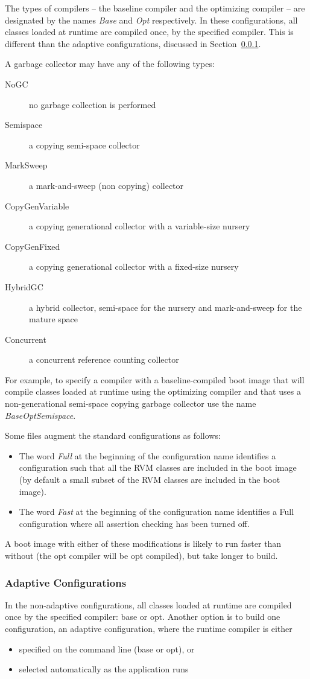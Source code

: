 The types of compilers -- the baseline compiler and 
the optimizing compiler -- are designated by the names {\em Base}
and {\em Opt} respectively.  In these configurations,
all classes loaded at runtime are compiled once, by the specified
compiler.  This is different than the adaptive configurations,
discussed in Section~\ref{adaptive-configs}.

A garbage collector may have any of the following types:

\begin{description}
\item[NoGC] no garbage collection is performed
\item[Semispace] a copying semi-space collector
\item[MarkSweep] a mark-and-sweep (non copying) collector
\item[CopyGenVariable] a copying generational collector with a
variable-size nursery
\item[CopyGenFixed] a copying generational collector with a
fixed-size nursery
\item[HybridGC] a hybrid collector, semi-space for the nursery and
mark-and-sweep for the mature space
\item[Concurrent] a concurrent reference counting collector
\end{description}

For example, to specify a compiler with a baseline-compiled boot image
that will 
compile classes loaded at runtime using the optimizing compiler and that uses
a non-generational semi-space copying garbage collector use the name 
{\em BaseOptSemispace}.

Some files augment the standard configurations as follows:
\begin{itemize}
\item The word 
{\em Full} at the beginning of the configuration name identifies a 
configuration
such that all the RVM classes are included in the boot image (by default
a small subset of the RVM classes are included in the boot image). 
\item The word
{\em Fast} at the beginning of the configuration name identifies a Full
configuration where all assertion checking has been turned off. 
\end{itemize}
A boot image with
either of these modifications is likely to run faster than without
(the opt compiler will be opt compiled),
but take longer to build.  

\subsubsection{Adaptive Configurations} \label{adaptive-configs}
In the non-adaptive configurations, all classes
loaded at runtime are compiled once by the specified
compiler: base or opt.  Another option is to build one configuration,
an adaptive configuration,
where the runtime compiler is either
\begin{itemize}
\item specified on the command line (base or opt), or
\item selected automatically as the application runs
\end{itemize}

